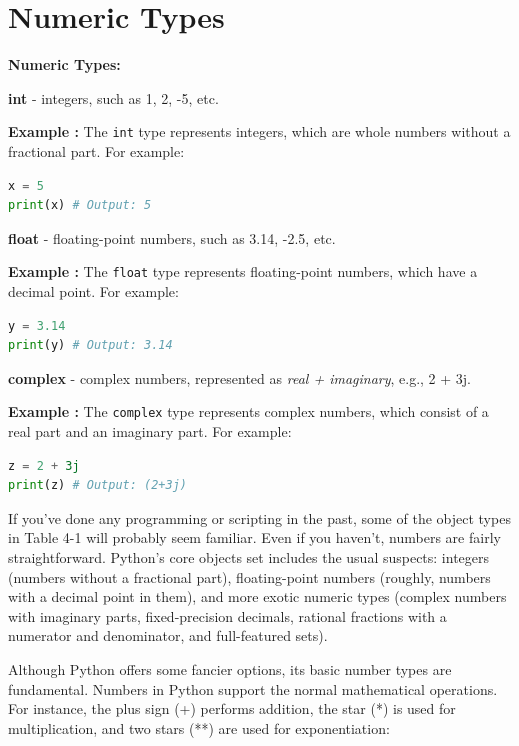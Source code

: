 \documentclass[12pt]{book}
\newtheorem{Example}{Example}[chapter]
\renewenvironment{Example}{\begin{trivlist}\item\relax
\textbf{Example \thesection: }}{\end{trivlist}}
\begin{document}
\section{Numeric Types}
\textbf{Numeric Types:}
\begin{itemize}
\item \textbf{int} - integers, such as 1, 2, -5, etc.\\
\begin{Example}
The \texttt{int} type represents integers, which are whole numbers without a fractional part. For example:
\begin{lstlisting}[language=Python]
x = 5
print(x) # Output: 5
\end{lstlisting}
\end{Example}
\item \textbf{float} - floating-point numbers, such as 3.14, -2.5, etc.\\
\begin{Example}
The \texttt{float} type represents floating-point numbers, which have a decimal point. For example:
\begin{lstlisting}[language=Python]
y = 3.14
print(y) # Output: 3.14
\end{lstlisting}
\end{Example}
\item \textbf{complex} - complex numbers, represented as \textit{real + imaginary}, e.g., 2 + 3j.\\
\begin{Example}
The \texttt{complex} type represents complex numbers, which consist of a real part and an imaginary part. For example:
\begin{lstlisting}[language=Python]
z = 2 + 3j
print(z) # Output: (2+3j)
\end{lstlisting}
\end{Example}
\end{itemize}

If you've done any programming or scripting in the past, some of the object types in Table 4-1 will probably seem familiar. Even if you haven't, numbers are fairly straightforward. Python's core objects set includes the usual suspects: integers (numbers without a fractional part), floating-point numbers (roughly, numbers with a decimal point in them), and more exotic numeric types (complex numbers with imaginary parts, fixed-precision decimals, rational fractions with a numerator and denominator, and full-featured sets).

Although Python offers some fancier options, its basic number types are fundamental. Numbers in Python support the normal mathematical operations. For instance, the plus sign (+) performs addition, the star (*) is used for multiplication, and two stars (**) are used for exponentiation:
\end{document}
